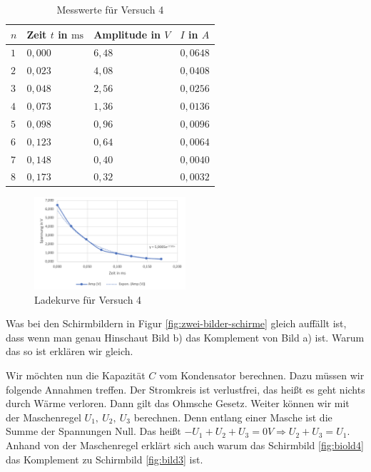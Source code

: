         \begin{table}[H]
            \centering
            \caption{Messwerte für Versuch 4}
            \begin{tabular}{|l|l|l|l|}
                \hline
                $n$ & Zeit $t$ in $\mathrm{ms}$ & Amplitude in $V$ & $I$ in $A$\\
                \hline\hline
                $1$ & $0,000$ & $6,48$ & $0,0648$\\
                \hline
                $2$ & $0,023$ & $4,08$ & $0,0408$\\
                \hline
                $3$ & $0,048$ & $2,56$ & $0,0256$\\
                \hline
                $4$ & $0,073$ & $1,36$ & $0,0136$\\
                \hline
                $5$ & $0,098$ & $0,96$ & $0,0096$\\
                \hline
                $6$ & $0,123$ & $0,64$ & $0,0064$\\
                \hline
                $7$ & $0,148$ & $0,40$ & $0,0040$\\
                \hline
                $8$ & $0,173$ & $0,32$ & $0,0032$\\
                \hline
            \end{tabular}
            \label{tab:versuch4}
        \end{table}

        \begin{figure}[H]
            \centering
            \includegraphics[width=0.5\textwidth]{bilder/Physik_05.png}
            \caption{Ladekurve für Versuch 4}
            \label{fig:versuch4}
        \end{figure}

        Was bei den Schirmbildern in Figur \ref{fig:zwei-bilder-schirme} gleich auffällt ist, dass wenn man genau Hinschaut Bild b) das Komplement von Bild a) ist. Warum das so ist erklären wir gleich. 
       
        Wir möchten nun die Kapazität $C$ vom Kondensator berechnen. Dazu müssen wir folgende Annahmen treffen. Der Stromkreis ist verlustfrei, das heißt es geht nichts durch Wärme verloren. Dann gilt das Ohmsche Gesetz. Weiter können wir mit der Maschenregel $U_1,\ U_2,\ U_3$ berechnen. Denn entlang einer Masche ist die Summe der Spannungen Null. Das heißt $-U_1 + U_2 + U_3 = 0V  \Rightarrow U_2 + U_3 = U_1$. Anhand von der Maschenregel erklärt sich auch warum das Schirmbild \ref{fig:biold4} das Komplement zu Schirmbild \ref{fig:bild3} ist.

